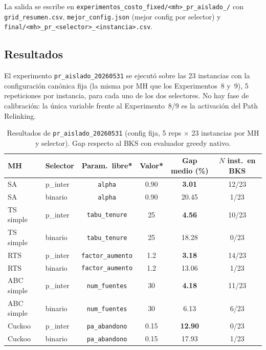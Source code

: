 La salida se escribe en
\texttt{experimentos\_costo\_fixed/<mh>\_pr\_aislado\_<YYYYMMDD-HHMM>/} con
\texttt{grid\_resumen.csv}, \texttt{mejor\_config.json} (mejor config por
selector) y \texttt{final/<mh>\_pr\_<selector>\_<instancia>.csv}.

\subsection{Resultados}

\begin{observacion}
El experimento \texttt{pr\_aislado\_20260531} se ejecutó sobre las 23 instancias
con la configuración canónica fija (la misma por MH que los Experimentos~8 y~9),
5 repeticiones por instancia, para cada uno de los dos selectores. No hay fase
de calibración: la única variable frente al Experimento~8/9 es la activación del
Path Relinking.
\end{observacion}

\begin{table}[h]
\centering
\caption{Resultados de \texttt{pr\_aislado\_20260531} (config fija, 5 reps
         $\times$ 23 instancias por MH y selector). Gap respecto al BKS con
         evaluador greedy nativo.}
\label{tab:pr-aislado-resultados}
\small
\begin{tabular}{llcccc}
\toprule
MH & Selector & Param.\ libre* & Valor* & Gap medio (\%) & $N$ inst.\ en BKS \\
\midrule
SA           & p\_inter & \texttt{alpha}           & 0.90 & \textbf{3.01}  & 12/23 \\
SA           & binario  & \texttt{alpha}           & 0.90 & 20.45 & 1/23 \\
TS simple    & p\_inter & \texttt{tabu\_tenure}    & 25   & \textbf{4.56}  & 10/23 \\
TS simple    & binario  & \texttt{tabu\_tenure}    & 25   & 18.28 & 0/23 \\
RTS          & p\_inter & \texttt{factor\_aumento} & 1.2  & \textbf{3.18}  & 14/23 \\
RTS          & binario  & \texttt{factor\_aumento} & 1.2  & 13.06 & 1/23 \\
ABC simple   & p\_inter & \texttt{num\_fuentes}    & 30   & \textbf{4.18}  & 11/23 \\
ABC simple   & binario  & \texttt{num\_fuentes}    & 30   & 6.13  & 6/23 \\
Cuckoo       & p\_inter & \texttt{pa\_abandono}    & 0.15 & \textbf{12.90} & 0/23 \\
Cuckoo       & binario  & \texttt{pa\_abandono}    & 0.15 & 17.93 & 1/23 \\
\bottomrule
\end{tabular}
\end{table}

